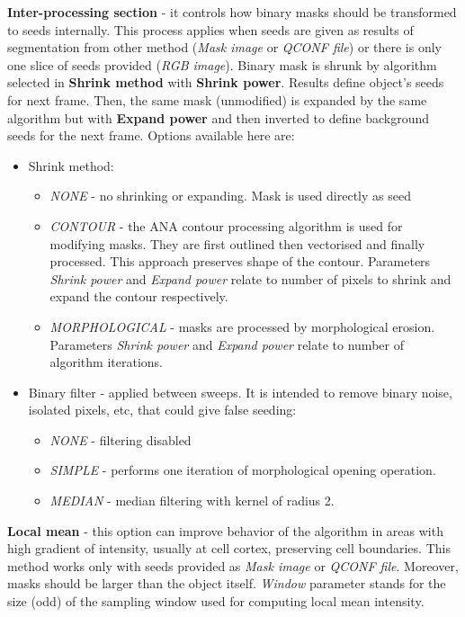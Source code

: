 \documentclass[a4paper,12pt]{article}
\begin{document}
\textbf{Inter-processing section} - it controls how binary masks should be transformed to seeds internally. This process applies when seeds are given as results of segmentation from other method (\textit{Mask image} or \textit{QCONF file}) or there is only one slice of seeds provided (\textit{RGB image}). Binary mask is shrunk by algorithm selected in \textbf{Shrink method} with \textbf{Shrink power}. Results define object's seeds for next frame. Then, the same mask (unmodified) is expanded by the same algorithm but with \textbf{Expand power} and then inverted to define background seeds for the next frame. Options available here are:
\begin{itemize}
	\item Shrink method:
	\begin{itemize}
		\item \textit{NONE} - no shrinking or expanding. Mask is used directly as seed
		\item \textit{CONTOUR} - the ANA contour processing algorithm is used for modifying masks. They are first outlined then vectorised and finally processed. This approach preserves shape of the contour. Parameters \textit{Shrink power} and \textit{Expand power} relate to number of pixels to shrink and expand the contour respectively. 
		\item \textit{MORPHOLOGICAL} - masks are processed by morphological erosion. Parameters \textit{Shrink power} and \textit{Expand power} relate to number of algorithm iterations. 
	\end{itemize}
	\item Binary filter - applied between sweeps. It is intended to remove binary noise, isolated pixels, etc, that could give false seeding:
	\begin{itemize}
		\item \textit{NONE} - filtering disabled
		\item \textit{SIMPLE} - performs one iteration of morphological opening operation.
		\item \textit{MEDIAN} - median filtering with kernel of radius 2.
	\end{itemize}
\end{itemize}

\textbf{Local mean} - this option can improve behavior of the algorithm in areas with high gradient of intensity, usually at cell cortex, preserving cell boundaries. This method works only with seeds provided as \textit{Mask image} or \textit{QCONF file}. Moreover, masks should be larger than the object itself. \textit{Window} parameter stands for the size (odd) of the sampling window used for computing local mean intensity.   
\end{document}
